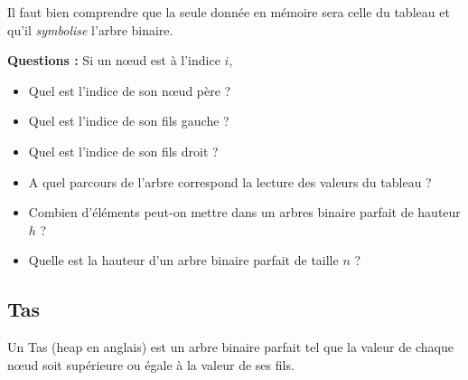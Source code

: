 \documentclass{../cours}
\begin{document}
Il faut bien comprendre que la seule donnée en mémoire sera celle du tableau et qu'il \emph{symbolise} l'arbre binaire.

\textbf{Questions :} Si un nœud est à l'indice $i$,
\begin{itemize}
\item Quel est l'indice de son nœud père ? 
\item Quel est l'indice de son fils gauche ? 
\item Quel est l'indice de son fils droit ? 
\item A quel parcours de l'arbre correspond la lecture des valeurs du tableau ?  
\item Combien d'éléments peut-on mettre dans un arbres binaire parfait de hauteur $h$ ? 
\item Quelle est la hauteur d'un arbre binaire parfait de taille $n$ ? 
\end{itemize}

\subsection{Tas}

\begin{Definition}
Un Tas (heap en anglais) est un arbre binaire parfait tel que la valeur de chaque nœud soit supérieure ou égale à la valeur de ses fils.
\end{Definition}
\end{document}
